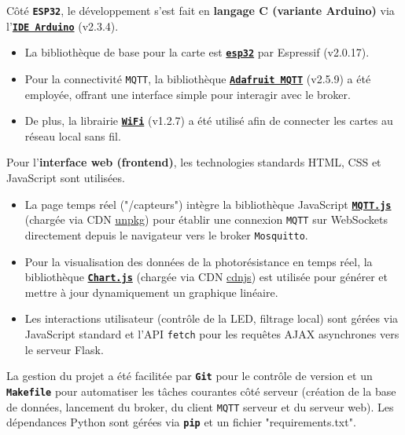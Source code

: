 \documentclass[12pt]{article}
\begin{document}
Côté \textbf{\texttt{ESP32}}, le développement s'est fait en \textbf{langage C (variante Arduino)} via l'\textbf{\href{https://www.arduino.cc/}{\texttt{IDE Arduino}}} (v2.3.4).
\begin{itemize}
    \item La bibliothèque de base pour la carte est \textbf{\href{https://github.com/espressif/arduino-esp32}{\texttt{esp32}}} par Espressif (v2.0.17).
    \item Pour la connectivité \texttt{MQTT}, la bibliothèque \textbf{\href{https://docs.arduino.cc/libraries/adafruit-mqtt-library/}{\texttt{Adafruit MQTT}}} (v2.5.9) a été employée, offrant une interface simple pour interagir avec le broker.
\item De plus, la librairie \textbf{\href{https://docs.arduino.cc/libraries/wifi/}{\texttt{WiFi}}} (v1.2.7) a été utilisé afin de connecter les cartes au réseau local sans fil.
\end{itemize} \hfill \break


Pour l'\textbf{interface web (frontend)}, les technologies standards HTML, CSS et JavaScript sont utilisées.
\begin{itemize}
    \item La page temps réel ("/capteurs") intègre la bibliothèque JavaScript \textbf{\href{https://github.com/mqttjs/MQTT.js/}{\texttt{MQTT.js}}} (chargée via CDN \href{https://unpkg.com/}{unpkg}) pour établir une connexion \texttt{MQTT} sur WebSockets directement depuis le navigateur vers le broker \texttt{Mosquitto}.
    \item Pour la visualisation des données de la photorésistance en temps réel, la bibliothèque \textbf{\href{https://www.chartjs.org/}{\texttt{Chart.js}}} (chargée via CDN \href{https://cdnjs.com/}{cdnjs}) est utilisée pour générer et mettre à jour dynamiquement un graphique linéaire.
    \item Les interactions utilisateur (contrôle de la LED, filtrage local) sont gérées via JavaScript standard et l'API \texttt{fetch} pour les requêtes AJAX asynchrones vers le serveur Flask.
\end{itemize} \hfill \break

La gestion du projet a été facilitée par \textbf{\texttt{Git}} pour le contrôle de version et un \textbf{\texttt{Makefile}} pour automatiser les tâches courantes côté serveur (création de la base de données, lancement du broker, du client \texttt{MQTT} serveur et du serveur web). Les dépendances Python sont gérées via \textbf{\texttt{pip}} et un fichier "requirements.txt".
\end{document}
